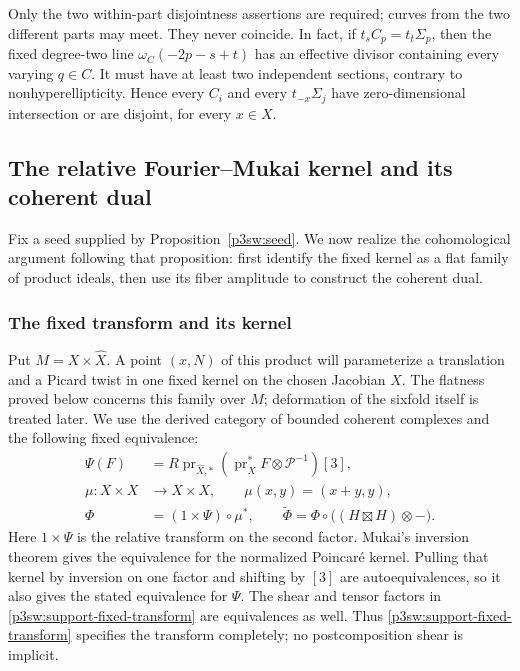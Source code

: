 \documentclass[11pt]{article}
\numberwithin{equation}{section}
\begin{document}
Only the two within-part disjointness assertions are required; curves
from the two different parts may meet.  They never coincide.  In fact,
if \(t_sC_p=t_t\Sigma_p\), then the fixed degree-two line
\(\omega_C(-2p-s+t)\) has an effective divisor containing every
varying \(q\in C\).  It must have at least two independent sections,
contrary to nonhyperellipticity.  Hence every \(C_i\) and every
\(t_{-x}\Sigma_j\) have zero-dimensional intersection or are
disjoint, for every \(x\in X\).

\subsection{The relative Fourier--Mukai kernel and its coherent dual}

Fix a seed supplied by Proposition~\ref{p3sw:seed}.  We now realize the
cohomological argument following that proposition: first identify the
fixed kernel as a flat family of product ideals, then use its fiber
amplitude to construct the coherent dual.

\subsubsection{The fixed transform and its kernel}

Put \(M=X\times\widehat X\).  A point \((x,N)\) of this product
will parameterize a translation and a Picard twist in one fixed kernel
on the chosen Jacobian \(X\).  The flatness proved below concerns this
family over \(M\); deformation of the sixfold itself is treated later.
We use the derived category of bounded coherent complexes and the
following fixed equivalence:
\begin{equation}
 \begin{split}
 \Psi(F)&=
 R\operatorname{pr}_{\widehat X,*}
  (\operatorname{pr}_X^*F\otimes\mathcal P^{-1})[3],
 \\
 \mu:X\times X&\longrightarrow X\times X,\qquad
                \mu(x,y)=(x+y,y),
 \\
 \Phi&=(1\times\Psi)\circ\mu^*,\qquad
 \widetilde\Phi=\Phi\circ\bigl((H\boxtimes H)\otimes-\bigr).
 \end{split}
 \label{p3sw:support-fixed-transform}
\end{equation}
Here \(1\times\Psi\) is the relative transform on the second factor.
Mukai's inversion theorem
\cite[Theorem 2.2]{P3SWMukai1981} gives the equivalence for the
normalized Poincar\'e kernel.  Pulling that kernel by inversion on one
factor and shifting by \([3]\) are autoequivalences, so it also gives
the stated equivalence for \(\Psi\).  The shear and tensor factors in
\eqref{p3sw:support-fixed-transform} are equivalences as well.  Thus \eqref{p3sw:support-fixed-transform} specifies the transform
completely; no postcomposition shear is implicit.
\end{document}
